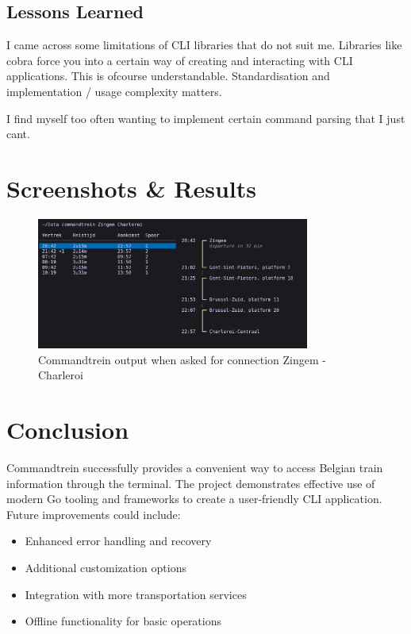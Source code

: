\documentclass[10pt,a4paper]{article}
\begin{document}
\subsection{Lessons Learned}

I came across some limitations of CLI libraries that do not suit me. Libraries like cobra force you into a certain way of creating and interacting with CLI applications. This is ofcourse understandable. Standardisation and implementation / usage complexity matters.

I find myself too often wanting to implement certain command parsing that I just cant.

\section{Screenshots \& Results}

\begin{figure}[h]
	\centering
	\includegraphics[width=0.8\textwidth]{./images/commandtrein.png}
	\caption{Commandtrein output when asked for connection Zingem - Charleroi}
	\label{fig:screenshot1}


\end{figure}\section{Conclusion}
Commandtrein successfully provides a convenient way to access Belgian train information through the terminal. The project demonstrates effective use of modern Go tooling and frameworks to create a user-friendly CLI application. Future improvements could include:
\begin{itemize}
	\item Enhanced error handling and recovery
	\item Additional customization options
	\item Integration with more transportation services
	\item Offline functionality for basic operations
\end{itemize}
\end{document}
